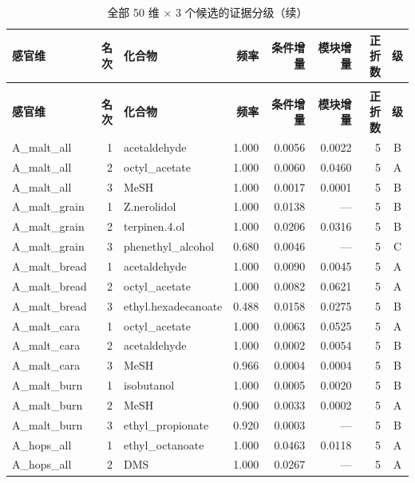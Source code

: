 \begin{longtable}{@{}p{} r p{} r r r r c@{}}
\caption{全部 50 维 $\times$ 3 个候选的证据分级（101 A / 42 B / 7 C）}\\
\toprule
\textbf{感官维} & \textbf{名次} & \textbf{化合物} & \textbf{频率} & \textbf{条件增量} & \textbf{模块增量} & \textbf{正折数} & \textbf{级} \\
\endfirsthead
\caption*{全部 50 维 $\times$ 3 个候选的证据分级（续）}\\
\toprule
\textbf{感官维} & \textbf{名次} & \textbf{化合物} & \textbf{频率} & \textbf{条件增量} & \textbf{模块增量} & \textbf{正折数} & \textbf{级} \\
\endhead
\bottomrule
\endlastfoot
A\_malt\_all & 1 & acetaldehyde & 1.000 & 0.0056 & 0.0022 & 5 & B \\
A\_malt\_all & 2 & octyl\_acetate & 1.000 & 0.0060 & 0.0460 & 5 & A \\
A\_malt\_all & 3 & MeSH & 1.000 & 0.0017 & 0.0001 & 5 & B \\
A\_malt\_grain & 1 & Z.\allowbreak{}nerolidol & 1.000 & 0.0138 & --- & 5 & B \\
A\_malt\_grain & 2 & terpinen.\allowbreak{}4.\allowbreak{}ol & 1.000 & 0.0206 & 0.0316 & 5 & B \\
A\_malt\_grain & 3 & phenethyl\_alcohol & 0.680 & 0.0046 & --- & 5 & C \\
A\_malt\_bread & 1 & acetaldehyde & 1.000 & 0.0090 & 0.0045 & 5 & A \\
A\_malt\_bread & 2 & octyl\_acetate & 1.000 & 0.0082 & 0.0621 & 5 & A \\
A\_malt\_bread & 3 & ethyl.\allowbreak{}hexadecanoate & 0.488 & 0.0158 & 0.0275 & 5 & B \\
A\_malt\_cara & 1 & octyl\_acetate & 1.000 & 0.0063 & 0.0525 & 5 & A \\
A\_malt\_cara & 2 & acetaldehyde & 1.000 & 0.0002 & 0.0054 & 5 & B \\
A\_malt\_cara & 3 & MeSH & 0.966 & 0.0004 & 0.0004 & 5 & B \\
A\_malt\_burn & 1 & isobutanol & 1.000 & 0.0005 & 0.0020 & 5 & B \\
A\_malt\_burn & 2 & MeSH & 0.900 & 0.0033 & 0.0002 & 5 & A \\
A\_malt\_burn & 3 & ethyl\_propionate & 0.920 & 0.0003 & --- & 5 & B \\
A\_hops\_all & 1 & ethyl\_octanoate & 1.000 & 0.0463 & 0.0118 & 5 & A \\
A\_hops\_all & 2 & DMS & 1.000 & 0.0267 & --- & 5 & A \\

\end{longtable}
